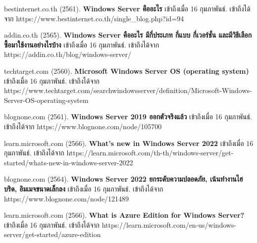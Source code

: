 \begin{thebibliography}{99}

bestinternet.co.th (2561). \textbf{Windows Server คืออะไร} เข้าถึงเมื่อ 16 กุมภาพันธ์. เข้าถึงได้จาก  https://www.bestinternet.co.th/single\_blog.php?id=94

addin.co.th (2565). \textbf{Windows Server คืออะไร มีกี่ประเภท กี่แบบ กี่เวอร์ชั่น และมีวิธีเลือกซื้อมาใช้งานอย่างไรบ้าง} เข้าถึงเมื่อ 16 กุมภาพันธ์. เข้าถึงได้จาก https://addin.co.th/blog/windows-server/

techtarget.com (2560). \textbf{Microsoft Windows Server OS (operating system)} เข้าถึงเมื่อ 16 กุมภาพันธ์. เข้าถึงได้จาก https://www.techtarget.com/searchwindowsserver/definition/Microsoft-Windows-Server-OS-operating-system

blognone.com (2561). \textbf{Windows Server 2019 ออกตัวจริงแล้ว} เข้าถึงเมื่อ 16 กุมภาพันธ์. เข้าถึงได้จาก https://www.blognone.com/node/105700

learn.microsoft.com (2566). \textbf{What's new in Windows Server 2022} เข้าถึงเมื่อ 16 กุมภาพันธ์. เข้าถึงได้จาก
https://learn.microsoft.com/th-th/windows-server/get-started/whats-new-in-windows-server-2022

blognone.com (2564). \textbf{Windows Server 2022 ยกระดับความปลอดภัย, เน้นทำงานไฮบริด, อิมเมจขนาดเล็กลง} เข้าถึงเมื่อ 16 กุมภาพันธ์. เข้าถึงได้จาก
https://www.blognone.com/node/121489

learn.microsoft.com (2566). \textbf{What is Azure Edition for Windows Server?} เข้าถึงเมื่อ 16 กุมภาพันธ์. เข้าถึงได้จาก
https://learn.microsoft.com/en-us/windows-server/get-started/azure-edition 

\end{thebibliography}